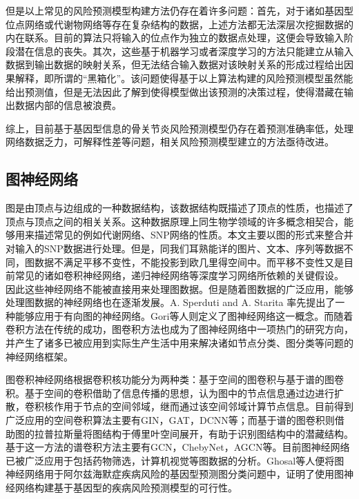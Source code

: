 但是以上常见的风险预测模型构建方法仍存在着许多问题：首先，对于诸如基因型位点网络或代谢物网络等存在复杂结构的数据，上述方法都无法深层次挖掘数据的内在联系。目前的算法只将输入的位点作为独立的数据点处理，这便会导致输入阶段潜在信息的丧失。其次，这些基于机器学习或者深度学习的方法只能建立从输入数据到输出数据的映射关系，但无法结合输入数据对该映射关系的形成过程给出因果解释，即所谓的“黑箱化”。该问题使得基于以上算法构建的风险预测模型虽然能给出预测值，但是无法因此了解到使得模型做出该预测的决策过程，使得潜藏在输出数据内部的信息被浪费。

综上，目前基于基因型信息的骨关节炎风险预测模型仍存在着预测准确率低，处理网络数据乏力，可解释性差等问题，相关风险预测模型建立的方法亟待改进。
\subsection{图神经网络}
图是由顶点与边组成的一种数据结构，该数据结构既描述了顶点的性质，也描述了顶点与顶点之间的相关关系。这种数据原理上同生物学领域的许多概念相契合，能够用来描述常见的例如代谢网络、SNP网络的性质。本文主要以图的形式来整合并对输入的SNP数据进行处理。但是，同我们耳熟能详的图片、文本、序列等数据不同，图数据不满足平移不变性，不能投影到欧几里得空间中。而平移不变性又是目前常见的诸如卷积神经网络，递归神经网络等深度学习网络所依赖的关键假设\cite{bronstein_geometric_2017}。 因此这些神经网络不能被直接用来处理图数据。但是随着图数据的广泛应用，能够处理图数据的神经网络也在逐渐发展。A. Sperduti and A. Starita\cite{sperduti_supervised_1997} 率先提出了一种能够应用于有向图的神经网络。Gori\cite{gori_new_2005}等人则定义了图神经网络这一概念。而随着卷积方法在传统的成功，图卷积方法也成为了图神经网络中一项热门的研究方向，并产生了诸多已被应用到实际生产生活中用来解决诸如节点分类、图分类等问题的神经网络框架。

图卷积神经网络根据卷积核功能分为两种类：基于空间的图卷积与基于谱的图卷积。基于空间的卷积借助了信息传播\cite{atwood_diffusion-convolutional_2016}的思想，认为图中的节点信息通过边进行扩散，卷积核作用于节点的空间邻域，继而通过该空间邻域计算节点信息。目前得到广泛应用的空间卷积算法主要有GIN\cite{xu_how_2019}，GAT\cite{velickovic_graph_2018}，DCNN\cite{atwood_diffusion-convolutional_2016}等；而基于谱的图卷积则借助图的拉普拉斯量将图结构于傅里叶空间展开，有助于识别图结构中的潜藏结构。基于这一方法的谱卷积方法主要有GCN\cite{kipf_semi-supervised_2017}，ChebyNet\cite{defferrard_convolutional_2017}，AGCN\cite{li_adaptive_2018}等。目前图神经网络已被广泛应用于包括药物筛选\cite{veselkov_hyperfoods:_2019,knyazev_spectral_2018}，计算机视觉\cite{yan_spatial_2018}等图数据的分析。Ghosal\cite{ghosal_biologically_2021}等人便将图神经网络用于阿尔兹海默症疾病风险的基因型预测图分类问题中，证明了使用图神经网络构建基于基因型的疾病风险预测模型的可行性。

